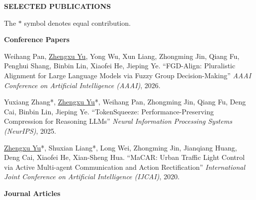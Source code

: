 \documentclass[11pt,letterpaper]{article}
\makeatletter
\newif\ifresearch
\renewcommand{\section}[1]{%
  \vspace{1.05em}%
  {\sffamily\bfseries\small\color{linkcolor}\MakeUppercase{#1}}\par
  \vspace{-0.25em}{\color{linkcolor}\rule{\textwidth}{0.9pt}}\par
  \vspace{0.55em}%
  \@afterindentfalse\@afterheading}
\renewcommand{\subsection}[1]{%
  \vspace{0.7em}%
  {\sffamily\bfseries\small #1}\par
  \vspace{0.35em}%
  \@afterindentfalse\@afterheading}
\newcommand{\gap}[1][14pt]{\rule{0pt}{#1}}
\newenvironment{datedentries}[1][3cm]
  {\begin{longtable}{@{}p{\dimexpr\textwidth-#1-18pt\relax}@{\hspace{8pt}}|@{\hspace{8pt}}>{\raggedleft\arraybackslash}p{#1}@{}}}
  {\end{longtable}}
\newenvironment{publist}
  {\begin{list}{}{%
     \setlength{\labelwidth}{2.6em}\setlength{\labelsep}{0.5em}%
     \setlength{\leftmargin}{3.1em}\setlength{\itemsep}{0.45em}%
     \setlength{\parsep}{0pt}\setlength{\topsep}{0.4em}%
     \renewcommand{\makelabel}[1]{\hfill\textbf{##1}}}}
  {\end{list}}
\newcommand{\pub}[1]{\item[#1]}
\newcommand{\me}{\underline{Zhengxu Yu}}
\newcommand{\venue}[1]{\textit{#1}}
\makeatother
\begin{document}

\ifresearch\clearpage\fi
\section{Selected Publications}

The $*$ symbol denotes equal contribution.

\subsection{Conference Papers}

\begin{publist}
\pub{C3} Weihang Pan, \me, Yong Wu, Xun Liang, Zhongming Jin, Qiang Fu, Penghui Shang, Binbin Lin,
  Xiaofei He, Jieping Ye. ``FGD-Align: Pluralistic Alignment for Large Language Models via Fuzzy
  Group Decision-Making'' \venue{AAAI Conference on Artificial Intelligence (AAAI)}, 2026.

\pub{C2} Yuxiang Zhang*, \me*, Weihang Pan, Zhongming Jin, Qiang Fu, Deng Cai, Binbin Lin,
  Jieping Ye. ``TokenSqueeze: Performance-Preserving Compression for Reasoning LLMs''
  \venue{Neural Information Processing Systems (NeurIPS)}, 2025.

\pub{C1} \me*, Shuxian Liang*, Long Wei, Zhongming Jin, Jianqiang Huang, Deng Cai, Xiaofei He,
  Xian-Sheng Hua. ``MaCAR: Urban Traffic Light Control via Active Multi-agent Communication and
  Action Rectification'' \venue{International Joint Conference on Artificial Intelligence
  (IJCAI)}, 2020.
\end{publist}

\subsection{Journal Articles}
\end{document}
